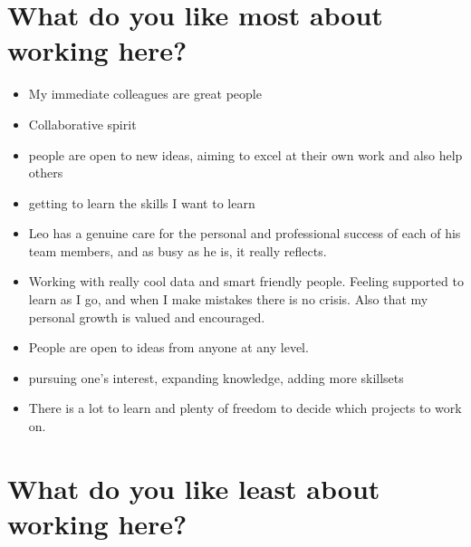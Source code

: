 \documentclass[
]{book}
\providecommand{\tightlist}{%
  \setlength{\itemsep}{0pt}\setlength{\parskip}{0pt}}
\begin{document}
\hypertarget{what-do-you-like-most-about-working-here}{%
\section{What do you like most about working here?}\label{what-do-you-like-most-about-working-here}}

\begin{itemize}
\tightlist
\item
  My immediate colleagues are great people
\item
  Collaborative spirit
\item
  people are open to new ideas, aiming to excel at their own work and also help others
\item
  getting to learn the skills I want to learn
\item
  Leo has a genuine care for the personal and professional success of each of his team members, and as busy as he is, it really reflects.
\item
  Working with really cool data and smart friendly people. Feeling supported to learn as I go, and when I make mistakes there is no crisis. Also that my personal growth is valued and encouraged.
\item
  People are open to ideas from anyone at any level.
\item
  pursuing one's interest, expanding knowledge, adding more skillsets
\item
  There is a lot to learn and plenty of freedom to decide which projects to work on.
\end{itemize}

\hypertarget{what-do-you-like-least-about-working-here}{%
\section{What do you like least about working here?}\label{what-do-you-like-least-about-working-here}}
\end{document}
